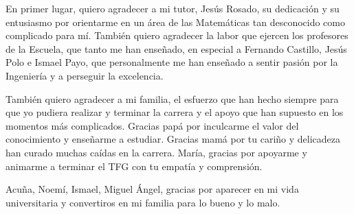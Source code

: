 \begin{agradecimientos}
En primer lugar, quiero agradecer a mi tutor, Jesús Rosado, su dedicación y su entusiasmo por orientarme en un área de las Matemáticas tan desconocido como complicado para mí. También quiero agradecer la labor que ejercen los profesores de la Escuela, que tanto me han enseñado, en especial a Fernando Castillo, Jesús Polo e Ismael Payo, que personalmente me han enseñado a sentir pasión por la Ingeniería y a perseguir la excelencia.

También quiero agradecer a mi familia, el esfuerzo que han hecho siempre para que yo pudiera realizar y terminar la carrera y el apoyo que han supuesto en los momentos más complicados. Gracias papá por inculcarme el valor del conocimiento y enseñarme a estudiar. Gracias mamá por tu cariño y delicadeza han curado muchas caídas en la carrera. María, gracias por apoyarme y animarme a terminar el TFG con tu empatía y comprensión.

Acuña, Noemí, Ismael, Miguel Ángel, gracias por aparecer en mi vida universitaria y convertiros en mi familia para lo bueno y lo malo.
\end{agradecimientos}